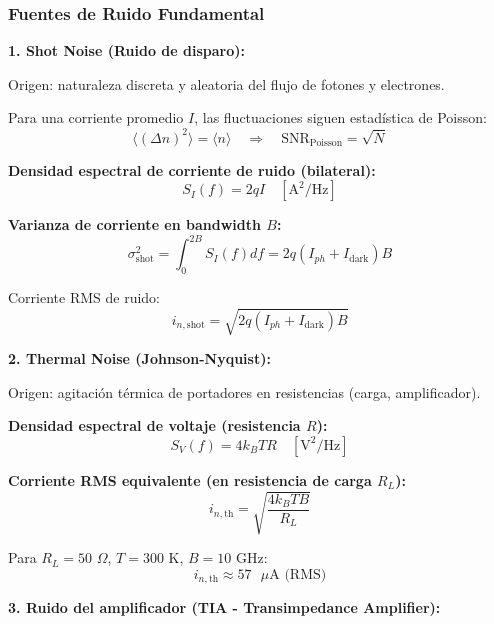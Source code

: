 \documentclass[11pt,a4paper]{article}
\begin{document}
\subsubsection{Fuentes de Ruido Fundamental}

\textbf{1. Shot Noise (Ruido de disparo):}

Origen: naturaleza discreta y aleatoria del flujo de fotones y electrones.

Para una corriente promedio $I$, las fluctuaciones siguen estadística de Poisson:
\begin{equation}
    \langle(\Delta n)^2\rangle = \langle n\rangle \quad \Rightarrow \quad \text{SNR}_{\text{Poisson}} = \sqrt{N}
\end{equation}

\textbf{Densidad espectral de corriente de ruido (bilateral):}
\begin{equation}
    S_I(f) = 2qI \quad [\text{A}^2/\text{Hz}]
\end{equation}

\textbf{Varianza de corriente en bandwidth $B$:}
\begin{equation}
    \sigma_{\text{shot}}^2 = \int_0^{2B} S_I(f)df = 2q(I_{ph} + I_{\text{dark}})B
\end{equation}

Corriente RMS de ruido:
\begin{equation}
    i_{n,\text{shot}} = \sqrt{2q(I_{ph} + I_{\text{dark}})B}
\end{equation}

\textbf{2. Thermal Noise (Johnson-Nyquist):}

Origen: agitación térmica de portadores en resistencias (carga, amplificador).

\textbf{Densidad espectral de voltaje (resistencia $R$):}
\begin{equation}
    S_V(f) = 4k_BT R \quad [\text{V}^2/\text{Hz}]
\end{equation}

\textbf{Corriente RMS equivalente (en resistencia de carga $R_L$):}
\begin{equation}
    i_{n,\text{th}} = \sqrt{\frac{4k_BTB}{R_L}}
\end{equation}

Para $R_L = 50$ $\Omega$, $T = 300$ K, $B = 10$ GHz:
\begin{equation}
    i_{n,\text{th}} \approx 57 \text{ $\mu$A (RMS)}
\end{equation}

\textbf{3. Ruido del amplificador (TIA - Transimpedance Amplifier):}
\end{document}
